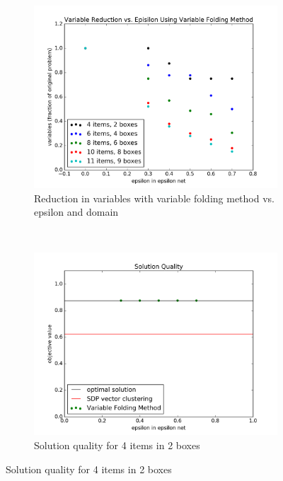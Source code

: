 \documentclass[12pt]{article} %
\begin{document}
\begin{figure}[ht!]
\centering
	\begin{subfigure}[b]{0.45\textwidth}
	\centering
	\includegraphics[width=\textwidth]{variables_epsilon_pigeon}
	\caption{Reduction in variables with variable folding method vs. epsilon and domain}
	\label{pigeon-reduction}
	\end{subfigure}
	~
	\begin{subfigure}[b]{0.45\textwidth}
	\centering
	\includegraphics[width=\textwidth]{solution_epsilon_n4m2}
	\caption{Solution quality for 4 items in 2 boxes}
	\label{n4m2}
	\end{subfigure}


\end{figure}
\end{document}
